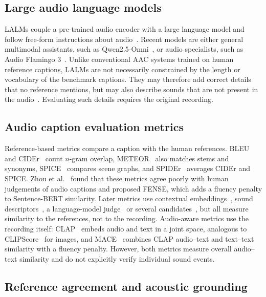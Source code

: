\documentclass{article}
\begin{document}
\subsection{Large audio language models}
\label{ssec:rw-lalm}

LALMs couple a pre-trained audio encoder with a large language model and follow free-form instructions about
audio~\cite{deshmukh2023pengi,gong2024ltu,tang2024salmonn,chu2023qwenaudio}. Recent models are either general
multimodal assistants, such as Qwen2.5-Omni~\cite{xu2025qwen25omni}, or audio specialists, such as Audio Flamingo
3~\cite{ghosh2025af3}. Unlike conventional AAC systems trained on human reference captions, LALMs are not necessarily
constrained by the length or vocabulary of the benchmark captions. They may therefore add correct details that no
reference mentions, but may also describe sounds that are not present in the audio~\cite{kuan2024hallucination}.
Evaluating such details requires the original recording.

\subsection{Audio caption evaluation metrics}
\label{ssec:rw-metrics}

Reference-based metrics compare a caption with the human references. BLEU~\cite{papineni2002bleu} and
CIDEr~\cite{vedantam2015cider} count $n$-gram overlap, METEOR~\cite{banerjee2005meteor} also matches stems and
synonyms, SPICE~\cite{anderson2016spice} compares scene graphs, and SPIDEr~\cite{liu2017spider} averages CIDEr
and SPICE. Zhou et al.~\cite{zhou2022fense} found that these metrics agree poorly with human judgements of audio
captions and proposed FENSE, which adds a fluency penalty to Sentence-BERT similarity. Later metrics use contextual
embeddings~\cite{zhang2020bertscore}, sound descriptors~\cite{wijngaard2023aces}, a language-model
judge~\cite{wu2025claira} or several candidates~\cite{labbe2022spidermax}, but all measure similarity to the
references, not to the recording. Audio-aware metrics use the recording itself:
CLAP~\cite{elizalde2023clap,elizalde2024msclap} embeds audio and text in a joint space, analogous to
CLIPScore~\cite{hessel2021clipscore} for images, and MACE~\cite{dixit2025mace} combines CLAP audio--text and text--text
similarity with a fluency penalty. However, both metrics measure overall audio--text similarity and do not explicitly
verify individual sound events.

\subsection{Reference agreement and acoustic grounding}
\label{ssec:rw-grounding}
\end{document}
